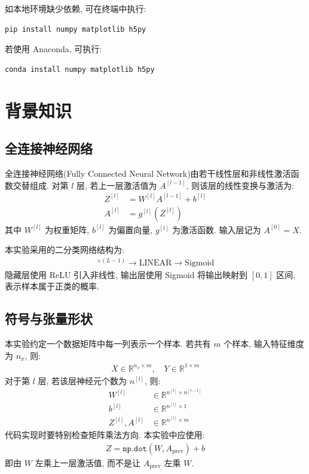 \documentclass{../../nndlcourse}
\begin{document}
如本地环境缺少依赖, 可在终端中执行:
\begin{verbatim}
pip install numpy matplotlib h5py
\end{verbatim}
若使用 Anaconda, 可执行:
\begin{verbatim}
conda install numpy matplotlib h5py
\end{verbatim}


\section{背景知识}

\subsection{全连接神经网络}

全连接神经网络(Fully Connected Neural Network)由若干线性层和非线性激活函数交替组成. 对第 $l$ 层, 若上一层激活值为 $A^{[l-1]}$, 则该层的线性变换与激活为:
\begin{align}
    Z^{[l]} &= W^{[l]}A^{[l-1]} + b^{[l]} \\
    A^{[l]} &= g^{[l]}\left(Z^{[l]}\right)
\end{align}
其中 $W^{[l]}$ 为权重矩阵, $b^{[l]}$ 为偏置向量, $g^{[l]}$ 为激活函数. 输入层记为 $A^{[0]}=X$.

本实验采用的二分类网络结构为:
\begin{align}
    [\mathrm{LINEAR} \to \mathrm{ReLU}]^{\times(L-1)}
    \to \mathrm{LINEAR} \to \mathrm{Sigmoid}
\end{align}
隐藏层使用 ReLU 引入非线性, 输出层使用 Sigmoid 将输出映射到 $[0,1]$ 区间, 表示样本属于正类的概率.

\subsection{符号与张量形状}

本实验约定一个数据矩阵中每一列表示一个样本. 若共有 $m$ 个样本, 输入特征维度为 $n_x$, 则:
\begin{align}
    X \in \mathbb{R}^{n_x \times m}, \quad
    Y \in \mathbb{R}^{1 \times m}
\end{align}
对于第 $l$ 层, 若该层神经元个数为 $n^{[l]}$, 则:
\begin{align}
    W^{[l]} &\in \mathbb{R}^{n^{[l]} \times n^{[l-1]}} \\
    b^{[l]} &\in \mathbb{R}^{n^{[l]} \times 1} \\
    Z^{[l]}, A^{[l]} &\in \mathbb{R}^{n^{[l]} \times m}
\end{align}
代码实现时要特别检查矩阵乘法方向. 本实验中应使用:
\begin{align}
    Z = \texttt{np.dot}(W,A_{\mathrm{prev}})+b
\end{align}
即由 $W$ 左乘上一层激活值, 而不是让 $A_{\mathrm{prev}}$ 左乘 $W$.
\end{document}
